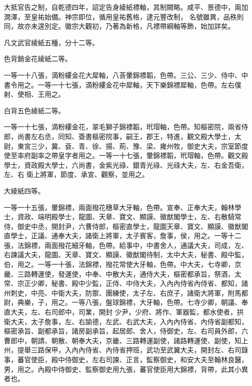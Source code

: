 \begin{pinyinscope}
 大抵官告之制，自乾德四年，詔定告身綾紙褾軸，其制闕略。咸平、景德中，兩加潤澤，至皇祐始備。神宗即位，循用皇祐舊格，逮元豐改制，
 名號雖異，品秩則同，故亦未遑別定。徽宗大觀初，乃著為新格，凡褾帶綱軸等飾，始加詳矣。



 凡文武官綾紙五種，分十二等。



 色背銷金花綾紙二等。



 一等一十八張，滴粉縷金花大犀軸，八荅暈錦褾韜，色帶。三公、三少、侍中、中書令用之。一等一十七張，滴粉縷金花中犀軸，天下樂錦褾犀軸，色帶。左右僕射、使相、王用之。



 白背五色綾紙二等。



 一等一十七張，滴粉縷金花，翠毛獅子錦褾韜，玳瑁軸，色帶。知樞密院，兩省侍郎，尚書左右丞，同知、簽書樞密院事，嗣王，郡王，特進，觀文殿大學士，太尉，東宮三少，冀、袞、青、徐、揚、荊、豫、梁、雍州牧，御史大夫，宗室節度使至率府副率之帶皇字者用之。一等一十七張，暈錦褾韜，玳瑁軸，色帶。觀文殿學士，資政殿大學士，六尚書，金紫光祿、銀青光祿、光祿大夫，左、右金吾衛，左、右
 衛上將軍，節度、承宣、觀察，並用之。



 大綾紙四等。



 一等一十五張，暈錦褾，兩面撥花穗草大牙軸，色帶。宣奉、正奉大夫，翰林學士，資政、端明殿學士，龍圖、天章、寶文、顯謨、徽猷閣學士，左、右散騎常侍，御史中丞，開封尹，六曹侍郎，樞密直學士，龍圖天章、寶文、顯謨、徽猷閣直學士，正議、通奉大夫，諸衛上將軍，太子賓客，詹事，侯，用之。一等十二張，法錦褾，兩面撥花細牙軸，色帶。給事中，中書舍人，通議大夫，司成，左、右諫議大夫，龍圖、天章、寶文、顯謨、徽猷閣待制，太中大夫，秘書、殿中監，伯，用之。一等一十張，法錦褾，撥花常使大牙軸，色帶。中大夫，七寺卿，京畿、三路轉運使，發運使，中奉、中散大夫，通侍大夫，樞密都承旨，祭酒，太常、宗正少卿，秘書、殿中少監，正侍、中侍大夫，入內內侍省內侍省、都知，諸州刺史，中亮、中衛大夫，防禦、團練使，太子左、右庶子，諸衛大將軍，附馬都尉，典樂，子，用之。一等八張，盤球錦褾，大牙軸，色帶。七寺少卿，朝議、奉直大夫，左、右司郎中，司業，開封
 少尹，少府、將作、軍器監，都水使者，拱衛大夫，太子詹事，左、右諭德，左武、右武大夫，入內內侍省、內侍省副都知，樞密承旨、副都承旨，諸房副承旨，起居郎、舍人，侍御史，左、右司員外郎，六曹郎中，朝請、朝散、朝奉大夫，京畿、三路轉運副使，諸路轉運使、副使，知上州，提舉三路保甲，入內內侍省、內侍省押班，武功至武翼大夫，開封左、右司錄事，蕃官使臣，殿中侍御史，左右司諫、正言，監察御史，和安大夫至翰林良醫，男，用之。內殿中侍御史、監察御史用九張，蕃官使臣用大錦褾，背帶，此其小異者也。




\end{pinyinscope}
